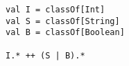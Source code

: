 \begin{lstlisting}[style=scalaioScala]
val I = classOf[Int]
val S = classOf[String]
val B = classOf[Boolean]

I.* ++ (S | B).*
\end{lstlisting}
